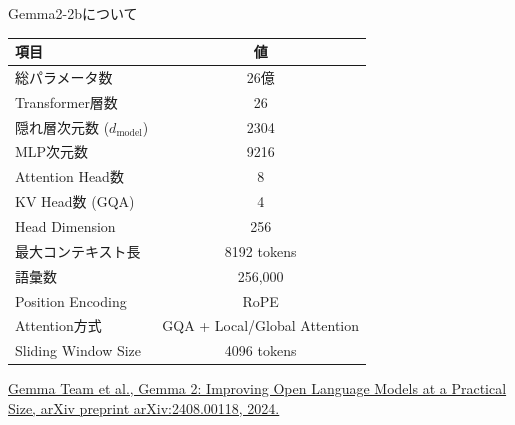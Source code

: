 \documentclass[aspectratio=43,xcolor=dvipsnames]{beamer}
\begin{document}
\begin{frame}{Gemma2-2bについて}
    \footnotesize
    \begin{table}[h]
        \centering
        \begin{tabular}{lc}
            \hline
            項目 & 値 \\
            \hline
            総パラメータ数 & 26億 \\
            Transformer層数 & 26 \\
            隠れ層次元数 ($d_{\mathrm{model}}$) & 2304 \\
            MLP次元数 & 9216 \\
            Attention Head数 & 8 \\
            KV Head数 (GQA) & 4 \\
            Head Dimension & 256 \\
            最大コンテキスト長 & 8192 tokens \\
            語彙数 & 256,000 \\
            Position Encoding & RoPE \\
            Attention方式 & GQA + Local/Global Attention \\
            Sliding Window Size & 4096 tokens \\
            \hline
        \end{tabular}
    \end{table}
\vspace{0.5em}
\tiny
\href{https://arxiv.org/abs/2408.00118}{Gemma Team et al., Gemma 2: Improving Open Language Models at a Practical Size, arXiv preprint arXiv:2408.00118, 2024.}
\end{frame}
\end{document}
